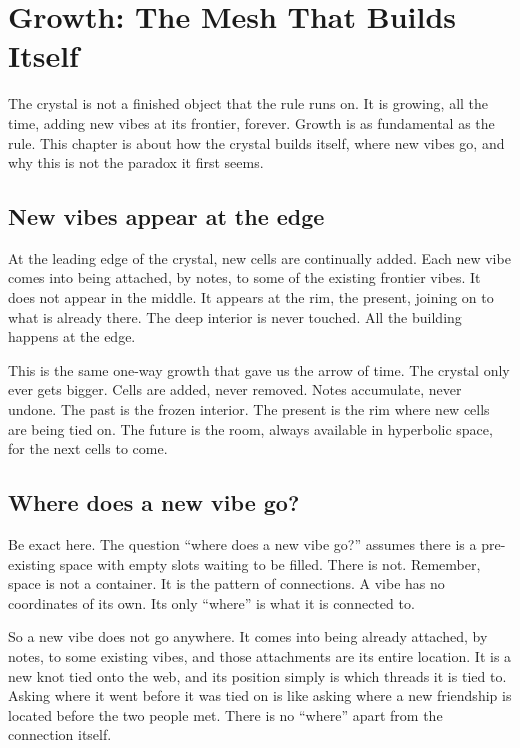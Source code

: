 \section{Growth: The Mesh That Builds Itself}

The crystal is not a finished object that the rule runs on. It is growing, all the time, adding new vibes at its frontier, forever. Growth is as fundamental as the rule. This chapter is about how the crystal builds itself, where new vibes go, and why this is not the paradox it first seems.

\subsection{New vibes appear at the edge}

At the leading edge of the crystal, new cells are continually added. Each new vibe comes into being attached, by notes, to some of the existing frontier vibes. It does not appear in the middle. It appears at the rim, the present, joining on to what is already there. The deep interior is never touched. All the building happens at the edge.

This is the same one-way growth that gave us the arrow of time. The crystal only ever gets bigger. Cells are added, never removed. Notes accumulate, never undone. The past is the frozen interior. The present is the rim where new cells are being tied on. The future is the room, always available in hyperbolic space, for the next cells to come.

\subsection{Where does a new vibe go?}

Be exact here. The question ``where does a new vibe go?'' assumes there is a pre-existing space with empty slots waiting to be filled. There is not. Remember, space is not a container. It is the pattern of connections. A vibe has no coordinates of its own. Its only ``where'' is what it is connected to.

So a new vibe does not go anywhere. It comes into being already attached, by notes, to some existing vibes, and those attachments are its entire location. It is a new knot tied onto the web, and its position simply is which threads it is tied to. Asking where it went before it was tied on is like asking where a new friendship is located before the two people met. There is no ``where'' apart from the connection itself.

